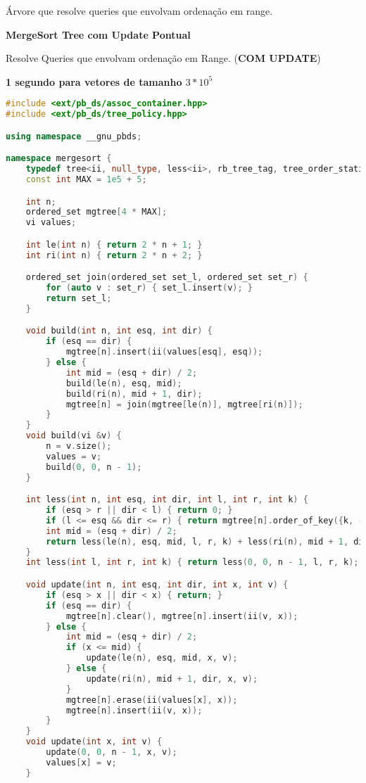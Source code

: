 \documentclass[11pt, a4paper, twoside]{book}
\begin{document}
Árvore que resolve queries que envolvam ordenação em range.





\textbf{MergeSort Tree com Update Pontual} 



Resolve Queries que envolvam ordenação em Range. (\textbf{COM UPDATE})  

\textbf{1 segundo para vetores de tamanho $3 * 10^5$}




\hfill

\begin{lstlisting}[language=C++]
#include <ext/pb_ds/assoc_container.hpp>
#include <ext/pb_ds/tree_policy.hpp>

using namespace __gnu_pbds;

namespace mergesort {
    typedef tree<ii, null_type, less<ii>, rb_tree_tag, tree_order_statistics_node_update> ordered_set;
    const int MAX = 1e5 + 5;

    int n;
    ordered_set mgtree[4 * MAX];
    vi values;

    int le(int n) { return 2 * n + 1; }
    int ri(int n) { return 2 * n + 2; }

    ordered_set join(ordered_set set_l, ordered_set set_r) {
        for (auto v : set_r) { set_l.insert(v); }
        return set_l;
    }

    void build(int n, int esq, int dir) {
        if (esq == dir) {
            mgtree[n].insert(ii(values[esq], esq));
        } else {
            int mid = (esq + dir) / 2;
            build(le(n), esq, mid);
            build(ri(n), mid + 1, dir);
            mgtree[n] = join(mgtree[le(n)], mgtree[ri(n)]);
        }
    }
    void build(vi &v) {
        n = v.size();
        values = v;
        build(0, 0, n - 1);
    }

    int less(int n, int esq, int dir, int l, int r, int k) {
        if (esq > r || dir < l) { return 0; }
        if (l <= esq && dir <= r) { return mgtree[n].order_of_key({k, -1}); }
        int mid = (esq + dir) / 2;
        return less(le(n), esq, mid, l, r, k) + less(ri(n), mid + 1, dir, l, r, k);
    }
    int less(int l, int r, int k) { return less(0, 0, n - 1, l, r, k); }

    void update(int n, int esq, int dir, int x, int v) {
        if (esq > x || dir < x) { return; }
        if (esq == dir) {
            mgtree[n].clear(), mgtree[n].insert(ii(v, x));
        } else {
            int mid = (esq + dir) / 2;
            if (x <= mid) {
                update(le(n), esq, mid, x, v);
            } else {
                update(ri(n), mid + 1, dir, x, v);
            }
            mgtree[n].erase(ii(values[x], x));
            mgtree[n].insert(ii(v, x));
        }
    }
    void update(int x, int v) {
        update(0, 0, n - 1, x, v);
        values[x] = v;
    }


\end{lstlisting}
\end{document}
